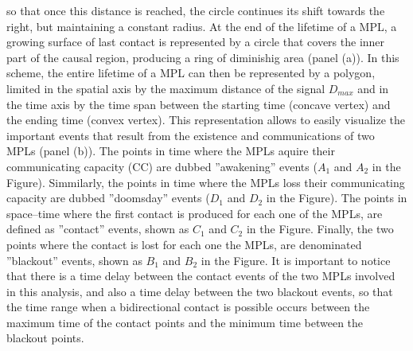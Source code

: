\documentclass[crop]{CSLB}%
\begin{document}
so that once this distance is reached, the circle continues its shift
towards the right, but maintaining a constant radius.
%
At the end of the lifetime of a MPL, a growing surface of last
contact is represented by a circle that covers the inner part of the
causal region, producing a ring of diminishig area (panel (a)).
%
In this scheme, the entire lifetime of a MPL can then be represented
by a polygon, limited in the spatial axis by the maximum distance of
the signal $D_{max}$ and in the time axis by the time span between the
starting time (concave vertex) and the ending time (convex vertex).
%
This representation allows to easily visualize the important events
that result from the existence and communications of two MPLs (panel
(b)).
%
The points in time where the MPLs aquire their communicating capacity
(CC) are dubbed ''awakening'' events ($A_1$ and $A_2$ in the Figure).
%
Simmilarly, the points in time where the MPLs loss their
communicating capacity are dubbed ''doomsday'' events ($D_1$ and $D_2$
in the Figure).
%
The points in space--time where the first contact is produced for each
one of the MPLs, are defined as ''contact'' events, shown as $C_1$
and $C_2$ in the Figure.
%
Finally, the two points where the contact is lost for each one the
MPLs, are denominated ''blackout'' events, shown as $B_1$ and $B_2$
in the Figure.
%
It is important to notice that there is a time delay between the
contact events of the two MPLs involved in this analysis, and also a
time delay between the two blackout events, so that the time range
when a bidirectional contact is possible occurs between the maximum
time of the contact points and the minimum time between the blackout
points.
\end{document}
